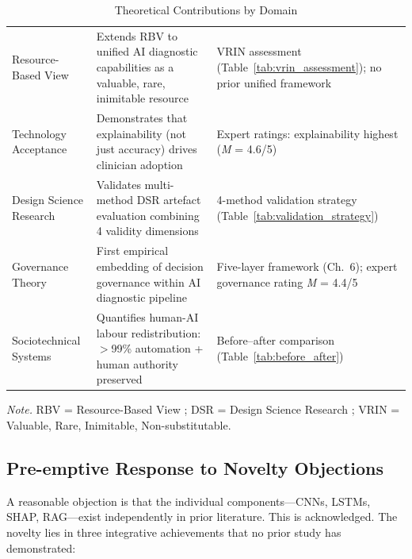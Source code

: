 \begin{table}[H]
\tablestripes
\begin{tabularx}{\textwidth}{L L L}
\toprule
{} &  &  \\
\midrule
Resource-Based View & Extends RBV to unified AI diagnostic capabilities as a valuable, rare, inimitable resource & VRIN assessment (Table~\ref{tab:vrin_assessment}); no prior unified framework \\
\addlinespace
Technology Acceptance & Demonstrates that explainability (not just accuracy) drives clinician adoption & Expert ratings: explainability highest (\textit{M} = 4.6/5) \\
\addlinespace
Design Science Research & Validates multi-method DSR artefact evaluation combining 4 validity dimensions & 4-method validation strategy (Table~\ref{tab:validation_strategy}) \\
\addlinespace
Governance Theory & First empirical embedding of decision governance within AI diagnostic pipeline & Five-layer framework (Ch.~6); expert governance rating \textit{M} = 4.4/5 \\
\addlinespace
Sociotechnical Systems & Quantifies human-AI labour redistribution: $>$99\% automation + human authority preserved & Before--after comparison (Table~\ref{tab:before_after}) \\
\bottomrule
\end{tabularx}
\caption{Theoretical Contributions by Domain}
\label{tab:theoretical_contributions}
\vspace{0.5em}\noindent\textit{Note.} RBV = Resource-Based View \citep{barney1991firm}; DSR = Design Science Research \citep{hevner2004design}; VRIN = Valuable, Rare, Inimitable, Non-substitutable.
\end{table}

\subsection{Pre-emptive Response to Novelty Objections}

A reasonable objection is that the individual components---CNNs, LSTMs, SHAP, RAG---exist independently in prior literature. This is acknowledged. The novelty lies in three integrative achievements that no prior study has demonstrated:

